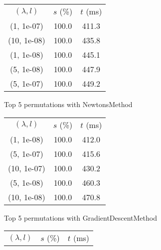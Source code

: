 \begin{figure}[H]
\label{fig:param_comp_MatrixSquareSum_NewtonsSearch}
\begin{subfigure}[ht]{.5\textwidth}
\begin{tabular}{|c|c|c|}
\hline
\rowcolor{gray!25}
\multicolumn{3}{|c|}{NewtonsMethod} \\
\hline
\rowcolor{gray!25}
$(\lambda,l)$ & $s$ (\%) & $t$ (ms) \\
\hline
(1, 1e-07) & 100.0 & 411.3 \\
(10, 1e-08) & 100.0 & 435.8 \\
(1, 1e-08) & 100.0 & 445.1 \\
(5, 1e-08) & 100.0 & 447.9 \\
(5, 1e-07) & 100.0 & 449.2 \\
\hline
\end{tabular}
\caption{Top 5 permutations with NewtonsMethod}
\label{subfig:param_comp_MatrixSquareSum_NewtonsMethod_NewtonsSearch}
\end{subfigure}
\hfill
\begin{subfigure}[ht]{.5\textwidth}
\begin{tabular}{|c|c|c|}
\hline
\rowcolor{gray!25}
\multicolumn{3}{|c|}{GradientDescentMethod} \\
\hline
\rowcolor{gray!25}
$(\lambda,l)$ & $s$ (\%) & $t$ (ms) \\
\hline
(1, 1e-08) & 100.0 & 412.0 \\
(5, 1e-07) & 100.0 & 415.6 \\
(10, 1e-07) & 100.0 & 430.2 \\
(5, 1e-08) & 100.0 & 460.3 \\
(10, 1e-08) & 100.0 & 470.8 \\
\hline
\end{tabular}
\caption{Top 5 permutations with GradientDescentMethod}
\label{subfig:param_comp_MatrixSquareSum_GradientDescentMethod_NewtonsSearch}
\end{subfigure}
\hfill
\begin{subfigure}[ht]{.5\textwidth}
\begin{tabular}{|c|c|c|}
\hline
\rowcolor{gray!25}
\multicolumn{3}{|c|}{ConjugateGradientMethod} \\
\hline
\rowcolor{gray!25}
$(\lambda,l)$ & $s$ (\%) & $t$ (ms) \\

\end{tabular}
\end{subfigure}
\end{figure}
